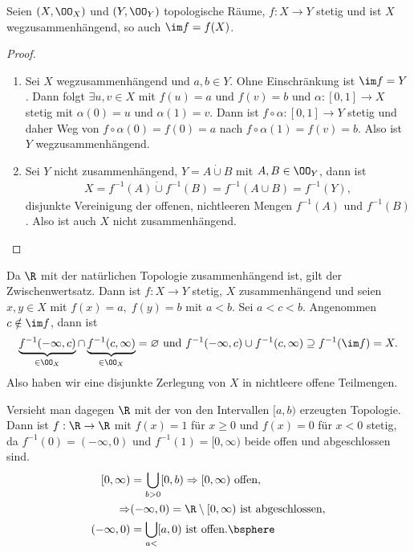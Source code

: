 \begin{prop}
\label{prop:2.2.26}
Seien $(X,\OO_X)$ und $(Y,\OO_Y)$ topologische Räume, $f: X\to Y$ stetig und
ist $X$ wegzusammenhängend, so auch $\im f = f(X)$.\fishhere
\end{prop}
\begin{proof}
\begin{enumerate}[label=\arabic{*}.)]
  \item Sei $X$ wegzusammenhängend und $a,b\in Y$. Ohne Einschränkung ist $\im
  f = Y$. Dann folgt $\exists u,v\in X$ mit $f(u) = a$ und $f(v) = b$ und
  $\alpha: [0,1]\to X$ stetig mit $\alpha(0) = u$ und $\alpha(1) = v$. Dann ist
  $f\circ\alpha:[0,1]\to Y$ stetig und daher Weg von $f\circ\alpha(0) = f(0) =
  a$ nach $f\circ\alpha(1) = f(v) = b$. Also ist $Y$ wegzusammenhängend.
  \item Sei $Y$ nicht zusammenhängend, $Y=A\dot{\cup} B$ mit $A,B\in\OO_Y$,
  dann ist
  \begin{align*}
    X = f^{-1}(A)\dot{\cup}f^{-1}(B) = f^{-1}(A\cup B) = f^{-1}(Y),
  \end{align*}
  disjunkte Vereinigung der offenen, nichtleeren Mengen $f^{-1}(A)$ und
  $f^{-1}(B)$. Also ist auch $X$ nicht zusammenhängend.
  \dipper\qedhere
\end{enumerate}
\end{proof}

\begin{bsp}
\label{bsp:2.2.27}
Da $\R$ mit der natürlichen Topologie zusammenhängend ist, gilt der
Zwischenwertsatz. Dann ist $f: X\to Y$ stetig, $X$ zusammenhängend und seien
$x,y\in X$ mit $f(x) = a,\;f(y)=b$ mit $a<b$. Sei $a<c<b$. Angenommen $c\notin
\im f$, dann ist
\begin{align*}
\underbrace{f^{-1}(-\infty,c)}_{\in\OO_X}\cap
\underbrace{f^{-1}(c,\infty)}_{\in\OO_X}=\varnothing \text{ und }
f^{-1}(-\infty,c)\cup f^{-1}(c,\infty) \supseteq f^{-1}(\im f) = X.
\end{align*}
Also haben wir eine disjunkte Zerlegung von $X$ in nichtleere offene
Teilmengen.\dipper

Versieht man dagegen $\R$ mit der von den Intervallen $[a,b)$ erzeugten
Topologie. Dann ist $f:\R\to\R$ mit $f(x)=1$ für $x\ge 0$ und $f(x) = 0$ für
$x<0$ stetig, da $f^{-1}(0) = (-\infty,0)$ und $f^{-1}(1) = [0,\infty)$ beide
offen und abgeschlossen sind.
\begin{align*}
\ [0,\infty)&= \bigcup_{b>0} [0,b) \Rightarrow [0,\infty) \text{ offen},\\
\Rightarrow & (-\infty,0) = \R\setminus[0,\infty) \text{ ist abgeschlossen},\\
(-\infty,0) &= \bigcup_{a<} [a,0) \text{ ist offen}.\bsphere
\end{align*}
\end{bsp}

